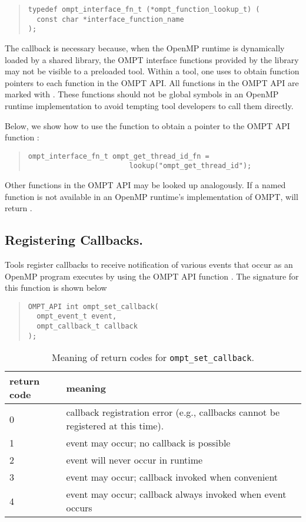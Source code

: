 \begin{quote}
\begin{verbatim}
typedef ompt_interface_fn_t (*ompt_function_lookup_t) (
  const char *interface_function_name
);
\end{verbatim}
\end{quote}

\noindent
The  callback is necessary because, when the OpenMP runtime is dynamically loaded by a shared library, the OMPT interface functions provided by the library may not be visible to a preloaded tool.
Within a tool, one uses  to obtain function pointers to each function in the OMPT API.
All functions in the OMPT API are marked with .
These functions should not be global symbols in an OpenMP runtime implementation to avoid tempting tool developers to call them directly. 

Below, we show how to use the  function to obtain a pointer to the OMPT API function :

\begin{quote}
\begin{verbatim}
ompt_interface_fn_t ompt_get_thread_id_fn =
                        lookup("ompt_get_thread_id");
\end{verbatim}
\end{quote}
Other functions in the OMPT API may be looked up analogously.
If a named function is not available in an OpenMP runtime's implementation of OMPT,  will return .

\subsection{Registering Callbacks.} 
Tools register callbacks to receive notification of various events that occur as an OpenMP program executes by using the OMPT API function .
The signature for this function is shown below
{
\begin{quote}
\begin{verbatim}
OMPT_API int ompt_set_callback(
  ompt_event_t event, 
  ompt_callback_t callback
);
\end{verbatim}
\end{quote}
}

\begin{table}
\centering
\begin{tabular}{|l|l|}
\hline
return code & meaning \\\hline
0 & callback registration error (e.g., callbacks cannot be registered at this time).\\\hline
1 & event may occur; no callback is possible\\\hline
2 & event will never occur in runtime\\\hline
3 & event may occur; callback invoked when convenient\\\hline
4 & event may occur; callback always invoked when event occurs\\\hline
\end{tabular}
\caption{Meaning of return codes for {\tt ompt\_set\_callback}.}
\label{table:ToolsSupport_set_rc}
\end{table}

